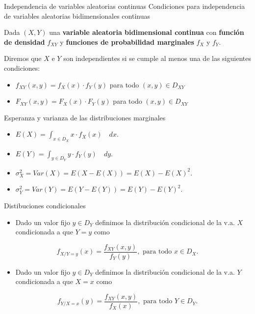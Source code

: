 \documentclass[
  ignorenonframetext,
]{beamer}
\providecommand{\tightlist}{%
  \setlength{\itemsep}{0pt}\setlength{\parskip}{0pt}}
\begin{document}
\begin{frame}{Independencia de variables aleatorias continuas}
\protect\hypertarget{independencia-de-variables-aleatorias-continuas-1}{}
Condiciones para independencia de variables aleatorias bidimensionales
continuas

Dada \((X,Y)\) una \textbf{variable aleatoria bidimensional continua}
con \textbf{función de densidad} \(f_{XY}\) y \textbf{funciones de
probabilidad marginales} \(f_X\) y \(f_Y\).

Diremos que \(X\) e \(Y\) son independientes si se cumple al menos una
de las siguientes condiciones:

\begin{itemize}
\item
  \(f_{XY}(x,y)=f_X(x)\cdot f_Y(y)\) para todo \((x,y)\in D_{XY}\)
\item
  \(F_{XY}(x,y)=F_X(x)\cdot F_Y(y)\) para todo \((x,y)\in D_{XY}\)
\end{itemize}
\end{frame}

\begin{frame}{Esperanza y varianza de las distribuciones marginales}
\protect\hypertarget{esperanza-y-varianza-de-las-distribuciones-marginales}{}
\begin{itemize}
\tightlist
\item
  \(E(X)=\displaystyle\int_{x\in D_X} x\cdot f_X(x)\quad dx.\)
\item
  \(E(Y)=\displaystyle\int_{y\in D_Y} y\cdot f_Y(y)\quad dy.\)
\item
  \(\sigma_X^2=Var(X)=E(X-E(X))=E(X)-E(X)^2.\)
\item
  \(\sigma_Y^2=Var(Y)=E(Y-E(Y))=E(Y)-E(Y)^2.\)
\end{itemize}
\end{frame}

\begin{frame}{Distibuciones condicionales}
\protect\hypertarget{distibuciones-condicionales}{}
\begin{itemize}
\tightlist
\item
  Dado un valor fijo \(y\in D_Y\) definimos la distribución condicional
  de la v.a. \(X\) condicionada a que \(Y=y\) como
\end{itemize}

\[f_{X/Y=y}(x)=\frac{f_{XY}(x,y)}{f_Y(y)},\mbox{  para todo } x\in D_X.\]

\begin{itemize}
\tightlist
\item
  Dado un valor fijo \(y\in D_Y\) definimos la distribución condicional
  de la v.a. \(Y\) condicionada a que \(X=x\) como
\end{itemize}

\[f_{Y/X=x}(y)=\frac{f_{XY}(x,y)}{f_X(x)},\mbox{  para todo } Y\in D_Y.\]
\end{frame}
\end{document}
